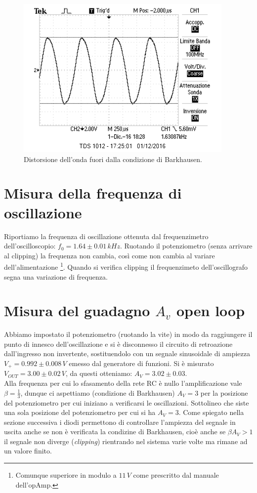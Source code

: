 \documentclass[10pt,a4paper]{article}
\begin{document}
\begin{figure}[!htb]
  \centering
  \includegraphics[scale=.5]{ondaDistorta.png}
\caption{Distorsione dell'onda fuori dalla condizione di Barkhausen.}
\label{distorta}
\end{figure}

\section{Misura della frequenza di oscillazione}
Riportiamo la frequenza di oscillazione ottenuta dal frequenzimetro dell'oscilloscopio: $f_0 = 1.64 \pm 0.01 \, kHz$. Ruotando il potenziometro (senza arrivare al clipping) la frequenza non cambia, così come non cambia al variare dell'alimentazione \footnote{Comunque superiore in modulo a $11\,V$ come prescritto dal manuale dell'opAmp.}. Quando si verifica clipping il frequenzimeto dell'oscillografo segna una variazione di frequenza.\\

\section{Misura del guadagno $A_v$ open loop}
Abbiamo impostato il potenziometro (ruotando la vite) in modo da raggiungere il punto di innesco dell’oscillazione e si è disconnesso il circuito di retroazione dall’ingresso non invertente, sostituendolo con un segnale sinusoidale di ampiezza $V_+=0.992 \pm 0.008\,V$ emesso dal generatore di funzioni. Si è misurato $V_{OUT} = 3.00 \pm 0.02 \,V$, da questi otteniamo: $A_V = 3.02 \pm 0.03$.\\

Alla frequenza per cui lo sfasamento della rete RC è nullo l'amplificazione vale $\beta = \frac{1}{3}$, dunque ci aspettiamo (condizione di Barkhausen) $A_V = 3$ per la posizione del potenziometro per cui iniziano a verificarsi le oscillazioni. Sottolineo che siste una sola posizione del potenziometro per cui si ha $A_V = 3$. Come spiegato nella sezione successiva i diodi permettono di controllare l'ampiezza del segnale in uscita anche se non è verificata la condizine di Barkhausen, cioè anche se $\beta A_V > 1$ il segnale non diverge (\emph{clipping}) rientrando nel sistema varie volte ma rimane ad un valore finito.
\end{document}
